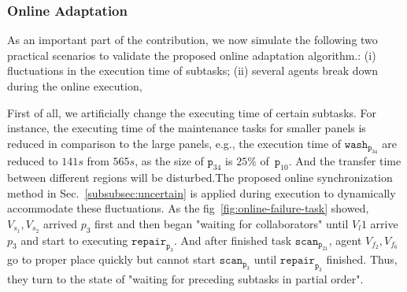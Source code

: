 \subsubsection{Online Adaptation}\label{subsubsec:exp-adapt}
As an important part of the contribution, we now simulate
the following two practical scenarios to validate the proposed online adaptation algorithm.:
(i) fluctuations in the execution time of subtasks;
(ii) several agents break down during the online execution,

First of all, we artificially change the executing time of certain subtasks.
For instance, the executing time of the maintenance tasks for smaller panels
is reduced in comparison to the large panels, e.g., the execution time
of $\texttt{wash}_{\texttt{p}_{34}}$ are reduced to $141s$ from $565s$, as the size
of $\texttt{p}_{34}$ is $25\%$ of~$\texttt{p}_{10}$. And the transfer time 
between different regions will be disturbed.The proposed online synchronization method in
 Sec.~\ref{subsubsec:uncertain} is applied during execution to dynamically accommodate these fluctuations.
As the fig~\ref{fig:online-failure-task} showed, $V_{s_1}, V_{s_2}$ arrived $p_3$ first
and then began "waiting for collaborators" until $V_l1$ arrive $p_3$ and start to executing
  $\texttt{repair}_{\texttt{p}_3}$. And after finished task $\texttt{scan}_{\texttt{p}_{21}}$,
  agent $V_{f_2},V_{f_6}$ go to proper place quickly but cannot start $\texttt{scan}_{\texttt{p}_3}$
  until $\texttt{repair}_{\texttt{p}_3}$ finished. Thus, they turn to the state of "waiting for preceding subtasks
  in partial order".



